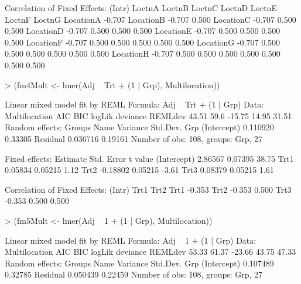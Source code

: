 \documentclass[12pt]{article}
\begin{document}
\begin{Schunk}
\begin{Soutput}
Correlation of Fixed Effects:
          (Intr) LoctnA LoctnB LoctnC LoctnD LoctnE LoctnF LoctnG
LocationA -0.707                                                 
LocationB -0.707  0.500                                          
LocationC -0.707  0.500  0.500                                   
LocationD -0.707  0.500  0.500  0.500                            
LocationE -0.707  0.500  0.500  0.500  0.500                     
LocationF -0.707  0.500  0.500  0.500  0.500  0.500              
LocationG -0.707  0.500  0.500  0.500  0.500  0.500  0.500       
LocationH -0.707  0.500  0.500  0.500  0.500  0.500  0.500  0.500
\end{Soutput}
\begin{Sinput}
> (fm4Mult <- lmer(Adj ~ Trt + (1 | Grp), Multilocation))
\end{Sinput}
\begin{Soutput}
Linear mixed model fit by REML 
Formula: Adj ~ Trt + (1 | Grp) 
   Data: Multilocation 
   AIC  BIC logLik deviance REMLdev
 43.51 59.6 -15.75    14.95   31.51
Random effects:
 Groups   Name        Variance Std.Dev.
 Grp      (Intercept) 0.110920 0.33305 
 Residual             0.036716 0.19161 
Number of obs: 108, groups: Grp, 27

Fixed effects:
            Estimate Std. Error t value
(Intercept)  2.86567    0.07395   38.75
Trt1         0.05834    0.05215    1.12
Trt2        -0.18802    0.05215   -3.61
Trt3         0.08379    0.05215    1.61

Correlation of Fixed Effects:
     (Intr) Trt1   Trt2  
Trt1 -0.353              
Trt2 -0.353  0.500       
Trt3 -0.353  0.500  0.500
\end{Soutput}
\begin{Sinput}
> (fm5Mult <- lmer(Adj ~ 1 + (1 | Grp), Multilocation))
\end{Sinput}
\begin{Soutput}
Linear mixed model fit by REML 
Formula: Adj ~ 1 + (1 | Grp) 
   Data: Multilocation 
   AIC   BIC logLik deviance REMLdev
 53.33 61.37 -23.66    43.75   47.33
Random effects:
 Groups   Name        Variance Std.Dev.
 Grp      (Intercept) 0.107489 0.32785 
 Residual             0.050439 0.22459 
Number of obs: 108, groups: Grp, 27


\end{Soutput}
\end{Schunk}
\end{document}
